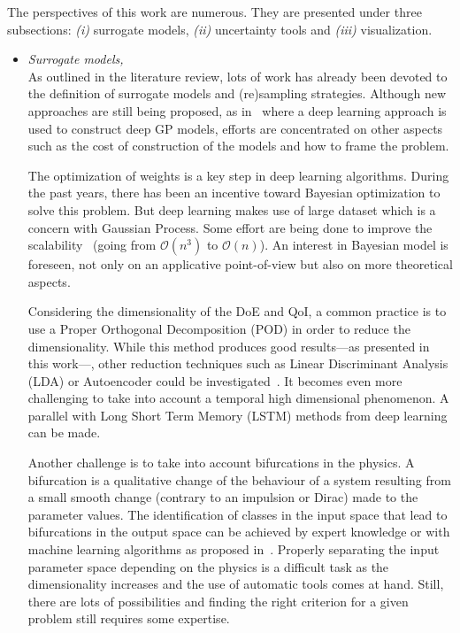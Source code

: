 
The perspectives of this work are numerous. They are presented under three subsections: \emph{(i)} surrogate models, \emph{(ii)} uncertainty tools and \emph{(iii)} visualization.

\begin{itemize}
\item \emph{Surrogate models,}\hfill\\
As outlined in the literature review, lots of work has already been devoted to the definition of surrogate models and (re)sampling strategies. Although new approaches are still being proposed, as in~\cite{raissi2016} where a deep learning approach is used to construct deep GP models, efforts are concentrated on other aspects such as the cost of construction of the models and how to frame the problem.

The optimization of weights is a key step in deep learning algorithms. During the past years, there has been an incentive toward Bayesian optimization to solve this problem. But deep learning makes use of large dataset which is a concern with Gaussian Process. Some effort are being done to improve the scalability~\cite{Wilson2015} (going from $\mathcal{O}(n^3)$ to $\mathcal{O}(n)$). An interest in Bayesian model is foreseen, not only on an applicative point-of-view but also on more theoretical aspects.

Considering the dimensionality of the DoE and QoI, a common practice is to use a Proper Orthogonal Decomposition (POD) in order to reduce the dimensionality. While this method produces good results---as presented in this work---, other reduction techniques such as Linear Discriminant Analysis (LDA) or Autoencoder could be investigated~\cite{Goodfellow2016}. It becomes even more challenging to take into account a temporal high dimensional phenomenon. A parallel with Long Short Term Memory (LSTM) methods from deep learning can be made.

Another challenge is to take into account bifurcations in the physics. A bifurcation is a qualitative change of the behaviour of a system resulting from a small smooth change (contrary to an impulsion or Dirac) made to the parameter values. The identification of classes in the input space that lead to bifurcations in the output space can be achieved by expert knowledge or with  machine learning algorithms as proposed in~\cite{Dupuis2018}. Properly separating the input parameter space depending on the physics is a difficult task as the dimensionality increases and the use of automatic tools comes at hand. Still, there are lots of possibilities and finding the right criterion for a given problem still requires some expertise.


\end{itemize}
